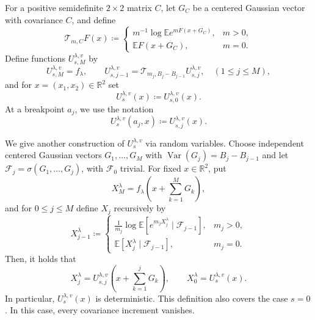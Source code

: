 \documentclass[11pt]{article}
\numberwithin{equation}{section}
\newcommand{\E}{\mathbb{E}}
\newcommand{\1}{\mathbf 1}
\newcommand{\Var}{\operatorname{Var}}
\begin{document}
For a positive semidefinite $2\times2$ matrix $C$, let $G_C$ be a
centered Gaussian vector with covariance $C$, and define
\begin{equation}
 \mathcal T_{m,C}F(x)\coloneqq
 \begin{cases}
 m^{-1}\log\E e^{mF(x+G_C)},&m>0,\\[2mm]
 \E F(x+G_C),&m=0.
 \end{cases}
 \label{eq:GTsemigroup}
\end{equation}
Define functions $U_{s,M}^{\lambda,v}$ by
\begin{equation}
 U_{s,M}^{\lambda,v}=f_\lambda,
 \qquad
 U_{s,j-1}^{\lambda,v}
 =\mathcal T_{m_j,B_j-B_{j-1}}U_{s,j}^{\lambda,v},
 \quad ( 1\le j \le M),
 \label{eq:U-stage-recursion}
\end{equation}
and for $x=(x_1,x_2) \in {\mathbb R}^2$ set
\begin{equation}
 U_s^{\lambda,v}(x)\coloneqq U_{s,0}^{\lambda,v}(x).
\end{equation}
At a breakpoint $a_j$, we use the notation
\begin{equation}\label{eq:U@a}
 U_s^{\lambda,v}(a_j,x)\coloneqq U_{s,j}^{\lambda,v}(x).
\end{equation}

We give another construction of $U_s^{\lambda,v}$ via random variables.
Choose independent centered Gaussian vectors
$G_1,\ldots,G_M$ with $\Var(G_j)=B_j-B_{j-1}$ and let
$\mathcal F_j=\sigma(G_1,\ldots,G_j)$, with $\mathcal F_0$ trivial.
For fixed $x\in\mathbb R^2$, put
\[
 X_M^\lambda=f_\lambda\left(x+\sum_{k=1}^MG_k\right) ,
\]
and for $0\le j \le M$ define $X_j$ recursively by
\begin{equation}
 X_{j-1}^\lambda \coloneqq
 \begin{cases}
 \displaystyle\frac1{m_j}\log\E\left[
 e^{m_jX_j^\lambda}\mid\mathcal F_{j-1}\right],&m_j>0,\\[3mm]
 \displaystyle\E\left[X_j^\lambda\mid\mathcal F_{j-1}\right],&m_j=0.
 \end{cases}
 \label{eq:U-conditional-recursion}
\end{equation}
Then, it holds that
\begin{equation}\label{eq:relationXU}
 X_j^\lambda=U_{s,j}^{\lambda,v}
 \left(x+\sum_{k=1}^jG_k\right),
 \qquad
 X_0^\lambda = U_s^{\lambda,v}(x).
\end{equation}
In particular, $U_s^{\lambda,v}(x)$ is deterministic.  This definition
also covers  the case $s=0$. 
In this case, every covariance increment vanishes. 
\end{document}
